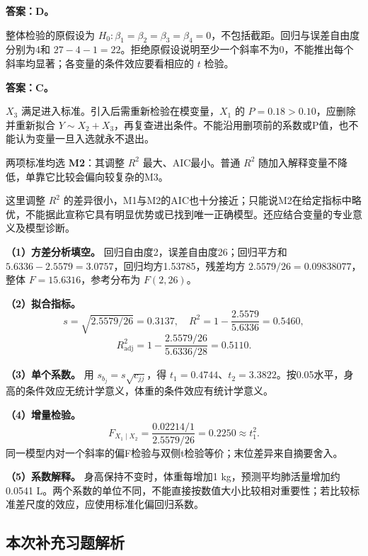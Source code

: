 \textbf{答案：D。}

整体检验的原假设为 \(H_0:\beta_1=\beta_2=\beta_3=\beta_4=0\)，不包括截距。回归与误差自由度分别为4和 \(27-4-1=22\)。拒绝原假设说明至少一个斜率不为0，不能推出每个斜率均显著；各变量的条件效应要看相应的 \(t\) 检验。





\textbf{答案：C。}

\(X_3\) 满足进入标准。引入后需重新检验在模变量，\(X_1\) 的 \(P=0.18>0.10\)，应删除并重新拟合 \(Y\sim X_2+X_3\)，再复查进出条件。不能沿用删项前的系数或P值，也不能认为变量一旦入选就永不退出。





两项标准均选 \textbf{M2}：其调整 \(R^2\) 最大、AIC最小。普通 \(R^2\) 随加入解释变量不降低，单靠它比较会偏向较复杂的M3。

这里调整 \(R^2\) 的差异很小，M1与M2的AIC也十分接近；只能说M2在给定指标中略优，不能据此宣称它具有明显优势或已找到唯一正确模型。还应结合变量的专业意义及模型诊断。





\textbf{（1）方差分析填空。} 回归自由度2，误差自由度26；回归平方和 \(5.6336-2.5579=3.0757\)，回归均方1.53785，残差均方 \(2.5579/26=0.09838077\)，整体 \(F=15.6316\)，参考分布为 \(F(2,26)\)。

\textbf{（2）拟合指标。} \[s=\sqrt{2.5579/26}=0.3137,\quad R^2=1-\frac{2.5579}{5.6336}=0.5460,\] \[R^2_{\mathrm{adj}}=1-\frac{2.5579/26}{5.6336/28}=0.5110.\]

\textbf{（3）单个系数。} 用 \(s_{b_j}=s\sqrt{c_{jj}}\)，得 \(t_1=0.4744\)、\(t_2=3.3822\)。按0.05水平，身高的条件效应无统计学意义，体重的条件效应有统计学意义。

\textbf{（4）增量检验。} \[F_{X_1\mid X_2}=\frac{0.02214/1}{2.5579/26}=0.2250\approx t_1^2.\] 同一模型内对一个斜率的偏F检验与双侧t检验等价；末位差异来自摘要舍入。

\textbf{（5）系数解释。} 身高保持不变时，体重每增加1 kg，预测平均肺活量增加约0.0541 L。两个系数的单位不同，不能直接按数值大小比较相对重要性；若比较标准差尺度的效应，应使用标准化偏回归系数。
\subsection*{本次补充习题解析}

\EndExercises
